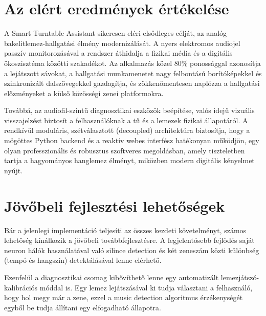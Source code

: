 \documentclass[12pt,a4paper,hungarian]{report}
\begin{document}
\section{Az elért eredmények értékelése}

A Smart Turntable Assistant sikeresen eléri elsődleges célját, az analóg bakelitlemez-hallgatási élmény modernizálását. A nyers elektromos audiojel passzív monitorozásával a rendszer áthidalja a fizikai média és a digitális ökoszisztéma közötti szakadékot. Az alkalmazás közel 80\% ponossággal azonosítja a lejátszott sávokat, a hallgatási munkamenetet nagy felbontású borítóképekkel és szinkronizált dalszövegekkel gazdagítja, és zökkenőmentesen naplózza a hallgatási előzményeket a külső közösségi zenei platformokra.

Továbbá, az audiofil-szintű diagnosztikai eszközök beépítése, valós idejű vizuális visszajelzést biztosít a felhasználóknak a tű és a lemezek fizikai állapotáról. A rendkívül moduláris, szétválasztott (decoupled) architektúra biztosítja, hogy a mögöttes Python backend és a reaktív webes interfész hatékonyan működjön, egy olyan professzionális és robusztus szoftveres megoldásban, amely tiszteletben tartja a hagyományos hanglemez élményt, miközben modern digitális kényelmet nyújt.

\section{Jövőbeli fejlesztési lehetőségek}

Bár a jelenlegi implementáció teljesíti az összes kezdeti követelményt, számos lehetőség kínálkozik a jövőbeli továbbfejlesztésre. A legjelentősebb fejlődés saját neuron hálók használatával való silince detection és két zeneszám közti különbség (tempó és hangszín) detektálásával lenne elérhető.

Ezenfelül a diagnosztikai csomag kibővíthető lenne egy automatizált lemezjátszó-kalibrációs móddal is. Egy lemez lejátszásával ki tudja választani a felhasználó, hogy hol megy már a zene, ezzel a music detection algoritmus érzékenységét egyből be tudja állítani egy elfogadható állapotra. 
\end{document}
